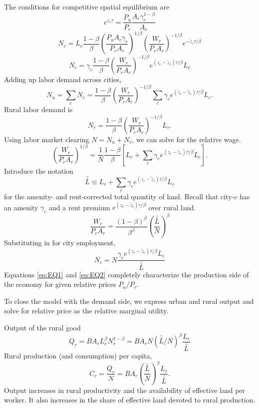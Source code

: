 \documentclass[12pt]{article}
\begin{document}
The conditions for competitive spatial equilibrium are
\begin{equation}\tag{i}\label{eq:EQ1}
e^{z_{c} \tau} = 
\frac{P_u}{P_r}
\frac {A_c \gamma_c^{1-\beta}}{A_r}
\end{equation}
\[
	N_c = L_c
\frac{1-\beta}{\beta} 
	 \left(\frac{P_uA_c\gamma_c}{P_rA_r}\right)^{1/\beta} 
	 \left(\frac{W_r}{P_rA_r}\right)^{-1/\beta} 
	 e^{-\tilde z_c{\tau/\beta}}
\]
\[
	N_c = \gamma_c 
\frac{1-\beta}{\beta} 
	 \left(\frac{W_r}{P_rA_r}\right)^{-1/\beta} 
	 e^{(z_c-\tilde z_c){\tau/\beta}}L_c
\]
Adding up labor demand across cities,
\[
N_u = \sum_c N_c 
= 
\frac{1-\beta}{\beta} 
	 \left(\frac{W_r}{P_rA_r}\right)^{-1/\beta} 
\sum_c\gamma_c e^{(z_c-\tilde z_c){\tau/\beta}}L_c.
\]
Rural labor demand is 
\[
N_r = 
\frac{1-\beta}{\beta} 
	 \left(\frac{W_r}{P_rA_r}\right)^{-1/\beta}L_r.
\]
Using labor market clearing $N=N_u+N_r$, we can solve for the relative wage.
\[
\left(\frac{W_r}{P_rA_r}\right)^{1/\beta}
= \frac{1}{N}
	\frac{1-\beta}{\beta} 
\left[
	L_r+
	\sum_c\gamma_c e^{(z_c-\tilde z_c){\tau/\beta}}L_c
\right].
\]
Introduce the notation 
\[
\bar{\bar L} \equiv L_r+
	\sum_c\gamma_c e^{(z_c-\tilde z_c){\tau/\beta}}L_c
\]
for the amenity- and rent-corrected total quantity of land. Recall that city-$c$ has an amenity $\gamma_c$ and a rent premium $e^{(z_c-\tilde z_c){\tau/\beta}}$ over rural land.
\[
\frac{W_r}{P_rA_r}
= 
	\frac{(1-\beta)^\beta}{\beta^\beta} 
\left(
\frac {\bar{\bar L}}{N}
\right)^{\beta}
\]
Substituting in for city employment,
\begin{equation}\tag{ii}\label{eq:EQ2}
	N_c =  N
\frac {\gamma_c e^{(z_c-\tilde z_c){\tau/\beta}}L_c}
	{\bar{\bar L}}
\end{equation}
Equations \eqref{eq:EQ1} and \eqref{eq:EQ2} completely characterize the production side of the economy for given relative prices $P_u/P_r$.

To close the model with the demand side, we express urban and rural output and solve for relative price as the relative marginal utility.

Output of the rural good
\[
Q_r = B A_r L_r^{\beta}N_r^{1-\beta}=
B A_r N (\bar{\bar L}/N)^{\beta}
\frac {L_r}
	{\bar{\bar L}}
\]
Rural production (and consumption) per capita,
\begin{equation}\label{eq:rural_per_capita}
C_r=\frac {Q_r}{N} = 
B A_r \left(\frac{\bar{\bar L}}{N}\right)^{\beta}
\frac {L_r}
	{\bar{\bar L}}
.
\end{equation}
Output increases in rural productivity and the availability of effective land per worker. It also increases in the share of effective land devoted to rural production.
\end{document}
